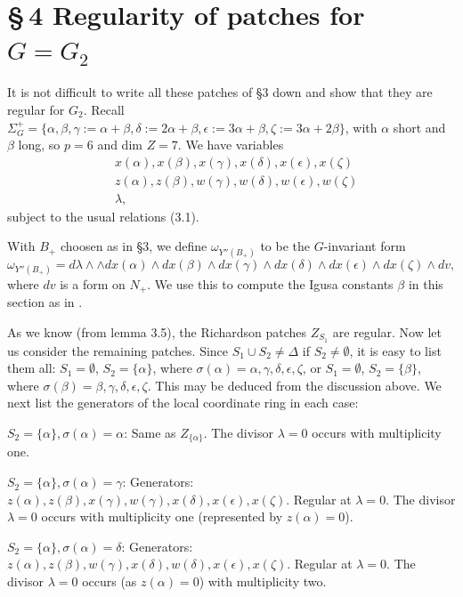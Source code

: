 \documentclass[12pt,letterpaper]{amsart}
\begin{document}
\section*{\S\,4 Regularity of patches for $G=G_2$}

It is not difficult to write all these patches of \S 3
down and show that they are
regular for $G_2$. Recall $\Sigma_G^+=\{\alpha,\beta,
\gamma:=\alpha+\beta,\delta:=2\alpha +\beta,
\epsilon:=3\alpha +\beta,\zeta:=3\alpha +2\beta\}$, with
$\alpha$ short and $\beta$ long, so $p=6$ and dim $Z=7$. We have variables
\[
\begin{split}
&x(\alpha),x(\beta),
x(\gamma),x(\delta),x(\epsilon),x(\zeta)\\
&z(\alpha),z(\beta),
w(\gamma),w(\delta),w(\epsilon),w(\zeta)\\
&\lambda,
\end{split}
\tag{4.1}
\]
subject to the usual relations (3.1).

With $B_+$ choosen as in \S 3, we define $\omega_{Y''(B_+)}$ to be the
$G$-invariant form
\[
\omega_{Y''(B_+)}=d\lambda \wedge
\wedge
dx(\alpha)\wedge dx(\beta)
\wedge dx(\gamma)\wedge dx(\delta)\wedge dx(\epsilon)\wedge dx(\zeta)
\wedge dv,
\]
where $dv$ is a form on $N_+$. We use this to compute the Igusa constants
$\beta$ in this section as in \cite{Ha89}.

As we know (from lemma 3.5), the Richardson patches $Z_{S_1}$ are regular.
Now let us consider the remaining patches. Since $S_1\cup S_2\not= \Delta$
if $S_2\not= \emptyset$, it is easy to list
them all: $S_1=\emptyset$, $S_2=\{\alpha\}$, where
$\sigma(\alpha)=\alpha,\gamma,\delta,\epsilon,\zeta$, or
$S_1=\emptyset$, $S_2=\{\beta\}$, where
$\sigma(\beta)=\beta,\gamma,\delta,\epsilon,\zeta$.
This may be deduced from the discussion above. We next list the generators of
the local coordinate ring in each case:

\noindent
$S_2=\{\alpha\}, \sigma(\alpha)=\alpha$: Same as $Z_{\{\alpha\}}$. The divisor
$\lambda =0$ occurs with multiplicity one.

\noindent
$S_2=\{\alpha\}, \sigma(\alpha)=\gamma$: Generators: $z(\alpha), z(\beta),
x(\gamma), w(\gamma), x(\delta), x(\epsilon),
x(\zeta)$. Regular at $\lambda =0$. The divisor $\lambda =0$
occurs with multiplicity one (represented by $z(\alpha)=0$).

\noindent
$S_2=\{\alpha\}, \sigma(\alpha)=\delta$: Generators: $z(\alpha), z(\beta),
w(\gamma), x(\delta),w(\delta), x(\epsilon),
x(\zeta)$. Regular at $\lambda =0$. The divisor $\lambda =0$
occurs (as $z(\alpha)=0$) with multiplicity two.
\end{document}
